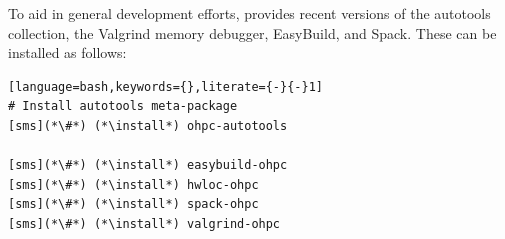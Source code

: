 To aid in general development efforts, \OHPC{} provides recent versions of the \GNU{}
autotools collection, the Valgrind memory debugger, EasyBuild, and Spack. These can be installed as follows:

\begin{lstlisting}[language=bash,keywords={},literate={-}{-}1]
# Install autotools meta-package
[sms](*\#*) (*\install*) ohpc-autotools

[sms](*\#*) (*\install*) easybuild-ohpc
[sms](*\#*) (*\install*) hwloc-ohpc
[sms](*\#*) (*\install*) spack-ohpc
[sms](*\#*) (*\install*) valgrind-ohpc
\end{lstlisting}
